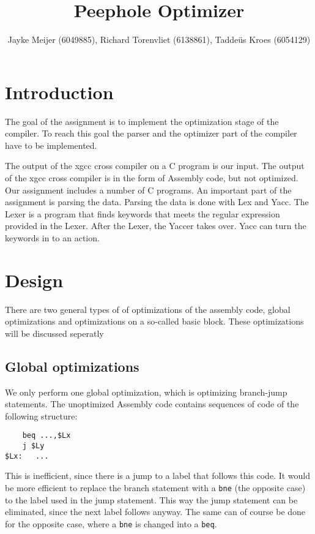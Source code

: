 \documentclass[10pt,a4paper]{article}
\title{Peephole Optimizer}
\author{Jayke Meijer (6049885), Richard Torenvliet (6138861), Tadde\"us Kroes
    (6054129)}
\begin{document}
\maketitle
\pagebreak
\tableofcontents
\pagebreak

\section{Introduction}

The goal of the assignment is to implement the optimization stage of the
compiler. To reach this goal the parser and the optimizer part of the compiler
have to be implemented.

The output of the xgcc cross compiler on a C program is our input. The output
of the xgcc cross compiler is in the form of Assembly code, but not optimized.
Our assignment includes a number of C programs. An important part of the
assignment is parsing the data. Parsing the data is done with Lex and Yacc. The
Lexer is a program that finds keywords that meets the regular expression
provided in the Lexer. After the Lexer, the Yaccer takes over. Yacc can turn
the keywords in to an action.

\section{Design}

There are two general types of of optimizations of the assembly code, global
optimizations and optimizations on a so-called basic block. These optimizations
will be discussed seperatly

\subsection{Global optimizations}

We only perform one global optimization, which is optimizing branch-jump
statements. The unoptimized Assembly code contains sequences of code of the
following structure:
\begin{lstlisting}
    beq ...,$Lx
    j $Ly
$Lx:   ...\end{lstlisting}
This is inefficient, since there is a jump to a label that follows this code.
It would be more efficient to replace the branch statement with a \texttt{bne}
(the opposite case) to the label used in the jump statement. This way the jump
statement can be eliminated, since the next label follows anyway. The same can
of course be done for the opposite case, where a \texttt{bne} is changed into a
\texttt{beq}.
\end{document}
